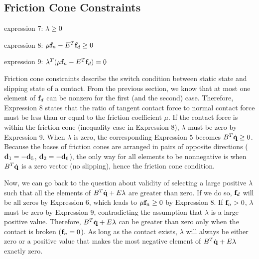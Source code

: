\subsection{Friction Cone Constraints}
\begin{packed_item}
\item{expression 7:} $\lambda \geq 0$
\item{expression 8:} $\mu\mathbf{f}_n - E^T\mathbf{f}_d \geq 0$
\item{expression 9:} $\lambda^T(\mu\mathbf{f}_n - E^T\mathbf{f}_d) = 0$
\end{packed_item}
Friction cone constraints describe the switch condition between static
state and slipping state of a contact. From the previous section, we
know that at most one element of $\mathbf{f}_d$ can be nonzero for the first (and
the second) case. Therefore, Expression 8 states that the ratio of tangent
contact force to normal contact force must be less than or equal to
the friction coefficient $\mu$. If the contact force is within the
friction cone (inequality case in Expression 8), $\lambda$ must be
zero by Expression 9. When $\lambda$ is zero, the corresponding
Expression 5 becomes $B^T\dot{\mathbf{q}} \geq 0$. Because the bases of
friction cones are arranged in pairs of opposite directions (\eg
$\mathbf{d}_1 = -\mathbf{d}_5$, $\mathbf{d}_2 = -\mathbf{d}_6$), the only way for all
elements to be nonnegative is when $B^T\dot{\mathbf{q}}$ is a zero vector
(no slipping), hence the friction cone condition.

Now, we can go back to the question about validity of selecting a
large positive $\lambda$ such that all the elements of
$B^T\dot{\mathbf{q}} + E\lambda$ are greater than zero. If we do so,
$\mathbf{f}_d$ will be all zeros by Expression 6, which leads to
$\mu\mathbf{f}_n \geq 0$ by Expression 8. If $\mathbf{f}_n > 0$, $\lambda$
must be zero by Expression 9, contradicting the assumption that
$\lambda$ is a large positive value. Therefore, $B^T\dot{\mathbf{q}} +
E\lambda$ can be greater than zero only when the contact is broken
($\mathbf{f}_n = 0$). As long as the contact exists, $\lambda$ will always
be either zero or a positive value that makes the most negative
element of $B^T\dot{\mathbf{q}} + E\lambda$ exactly zero.

